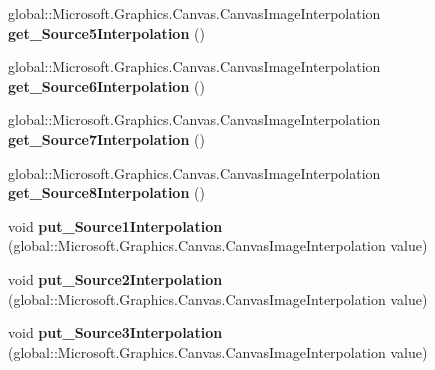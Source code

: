 \begin{DoxyCompactItemize}
global\+::\+Microsoft.\+Graphics.\+Canvas.\+Canvas\+Image\+Interpolation {\bfseries get\+\_\+\+Source5\+Interpolation} ()
\item 
\mbox{\label{class_microsoft_1_1_graphics_1_1_canvas_1_1_effects_1_1_pixel_shader_effect_a827cfc38c88dd3eca25b56959d438e1e}} 
global\+::\+Microsoft.\+Graphics.\+Canvas.\+Canvas\+Image\+Interpolation {\bfseries get\+\_\+\+Source6\+Interpolation} ()
\item 
\mbox{\label{class_microsoft_1_1_graphics_1_1_canvas_1_1_effects_1_1_pixel_shader_effect_a4be901dbaae8239c9b1b20c2cf3b4e2a}} 
global\+::\+Microsoft.\+Graphics.\+Canvas.\+Canvas\+Image\+Interpolation {\bfseries get\+\_\+\+Source7\+Interpolation} ()
\item 
\mbox{\label{class_microsoft_1_1_graphics_1_1_canvas_1_1_effects_1_1_pixel_shader_effect_abcfb588bd2c78312fd2f161567bda3f3}} 
global\+::\+Microsoft.\+Graphics.\+Canvas.\+Canvas\+Image\+Interpolation {\bfseries get\+\_\+\+Source8\+Interpolation} ()
\item 
\mbox{\label{class_microsoft_1_1_graphics_1_1_canvas_1_1_effects_1_1_pixel_shader_effect_a86a6985e956aa9e79a35a4a55ccc0714}} 
void {\bfseries put\+\_\+\+Source1\+Interpolation} (global\+::\+Microsoft.\+Graphics.\+Canvas.\+Canvas\+Image\+Interpolation value)
\item 
\mbox{\label{class_microsoft_1_1_graphics_1_1_canvas_1_1_effects_1_1_pixel_shader_effect_a4bd9048ba301d3d43134eefd4aa934eb}} 
void {\bfseries put\+\_\+\+Source2\+Interpolation} (global\+::\+Microsoft.\+Graphics.\+Canvas.\+Canvas\+Image\+Interpolation value)
\item 
\mbox{\label{class_microsoft_1_1_graphics_1_1_canvas_1_1_effects_1_1_pixel_shader_effect_ab5c019176e6cd992f132fb1853152f7b}} 
void {\bfseries put\+\_\+\+Source3\+Interpolation} (global\+::\+Microsoft.\+Graphics.\+Canvas.\+Canvas\+Image\+Interpolation value)

\end{DoxyCompactItemize}
